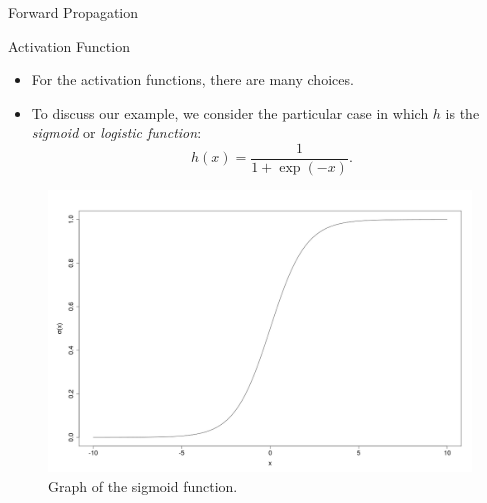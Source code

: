 \documentclass[8pt,american]{beamer}
\begin{document}
\begin{frame}{Forward Propagation}

\begin{block}{Activation Function}
\begin{itemize}
\justifying
\item For the activation functions, there are many choices.
\item To discuss our example, we consider the particular case in which $h$ is
  the \textit{sigmoid} or \textit{logistic function}:
  \begin{equation}
  h\left(x\right)=\frac{1}{1+\exp\left(-x\right)}.
  \label{eq:defn_sigm}
  \end{equation}
\end{itemize}
\begin{figure}[H]
\centering
\includegraphics[height=0.4\textheight]{../r/sigmoid.png}
\caption{Graph of the sigmoid function.}
\label{fig:graph_sigm}
\end{figure}
\end{block}

\end{frame}
\end{document}
